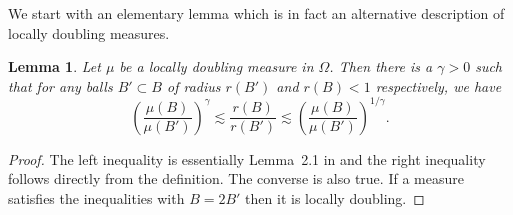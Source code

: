 \documentclass[12pt,twoside,final,psamsfonts]{amsart}
\theoremstyle{plain}
\newtheorem{lema}{Lemma}
\theoremstyle{remark}
\theoremstyle{definition}
\begin{document}
We start with an elementary lemma which is in fact an alternative 
description of locally doubling measures.

\begin{lema}\label{dis-mes}
Let $\mu$ be a locally
doubling measure in $\Omega$.  Then there is a $\gamma>0$
such that for any balls $B'\subset B$ of radius $r(B')$ and $r(B)<1$
respectively, we have
\[
\left(\frac{\mu(B)}{\mu(B')}\right)^{\gamma}\lesssim \frac {r(B)}{r(B')}
\lesssim \left(\frac{\mu(B)}{\mu(B')}\right)^{1/\gamma}.
\]
\end{lema}

\begin{proof}
The left inequality is essentially
Lemma~2.1 in \cite{Christ91} and the right inequality follows
directly from the definition. The converse is also true. If a measure
satisfies the inequalities with $B=2B'$ then it is locally doubling. 
\end{proof}
\end{document}

